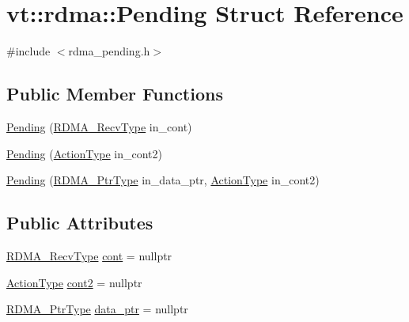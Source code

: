 \hypertarget{structvt_1_1rdma_1_1_pending}{}\section{vt\+:\+:rdma\+:\+:Pending Struct Reference}
\label{structvt_1_1rdma_1_1_pending}


{\ttfamily \#include $<$rdma\+\_\+pending.\+h$>$}

\subsection*{Public Member Functions}
\begin{DoxyCompactItemize}
\item 
\hyperlink{structvt_1_1rdma_1_1_pending_ab4ba68847f206e200ece5844f0bb6896}{Pending} (\hyperlink{namespacevt_1_1rdma_aa07fa86d8eca8853254b40fc0e565726}{R\+D\+M\+A\+\_\+\+Recv\+Type} in\+\_\+cont)
\item 
\hyperlink{structvt_1_1rdma_1_1_pending_a44bf0bdd07500e633545b82d8fb7bc35}{Pending} (\hyperlink{namespacevt_ae0a5a7b18cc99d7b732cb4d44f46b0f3}{Action\+Type} in\+\_\+cont2)
\item 
\hyperlink{structvt_1_1rdma_1_1_pending_ad14318ac7c35b7fc7ff8ec91b30004e5}{Pending} (\hyperlink{namespacevt_a9e2c953286c7616f7c218e9951790776}{R\+D\+M\+A\+\_\+\+Ptr\+Type} in\+\_\+data\+\_\+ptr, \hyperlink{namespacevt_ae0a5a7b18cc99d7b732cb4d44f46b0f3}{Action\+Type} in\+\_\+cont2)
\end{DoxyCompactItemize}
\subsection*{Public Attributes}
\begin{DoxyCompactItemize}
\item 
\hyperlink{namespacevt_1_1rdma_aa07fa86d8eca8853254b40fc0e565726}{R\+D\+M\+A\+\_\+\+Recv\+Type} \hyperlink{structvt_1_1rdma_1_1_pending_a379b732d7dfcd5fd42346c85583b8e08}{cont} = nullptr
\item 
\hyperlink{namespacevt_ae0a5a7b18cc99d7b732cb4d44f46b0f3}{Action\+Type} \hyperlink{structvt_1_1rdma_1_1_pending_a55d01ceada3293160e3167eb7194b9bd}{cont2} = nullptr
\item 
\hyperlink{namespacevt_a9e2c953286c7616f7c218e9951790776}{R\+D\+M\+A\+\_\+\+Ptr\+Type} \hyperlink{structvt_1_1rdma_1_1_pending_afcbb4951a3cfaa8981063487c0b90548}{data\+\_\+ptr} = nullptr
\end{DoxyCompactItemize}


